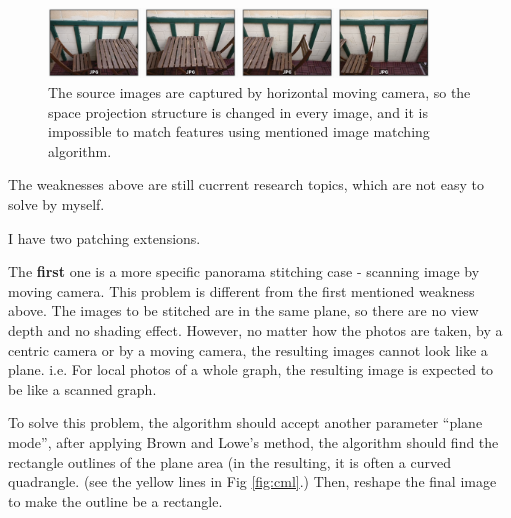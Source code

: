 \documentclass[10pt,twocolumn,letterpaper]{article}
\begin{document}
\begin{figure}
    \begin{center}
        \includegraphics[width=0.9\textwidth]{horizontal_motion}
    \end{center}
    \caption{The source images are captured by horizontal moving camera, so the space projection structure is changed in every image,
    and it is impossible to match features using mentioned image matching algorithm.}
    \label{fig:cameramotion}
\end{figure}

The weaknesses above are still cucrrent research topics, which are not easy to solve by myself.

I have two patching extensions.

The \textbf{first} one is a more specific panorama stitching case - scanning image by moving camera.
This problem is different from the first mentioned weakness above.
The images to be stitched are in the same plane, so there are no view depth and no shading effect.
However, no matter how the photos are taken, by a centric camera or by a moving camera, the resulting images cannot look like a plane.
i.e. For local photos of a whole graph, the resulting image is expected to be like a scanned graph.

To solve this problem, the algorithm should accept another parameter ``plane mode'',
after applying Brown and Lowe's method, the algorithm should find the rectangle outlines of the plane area
(in the resulting, it is often a curved quadrangle. (see the yellow lines in Fig \ref{fig:cml}.)
Then, reshape the final image to make the outline be a rectangle.
\end{document}
